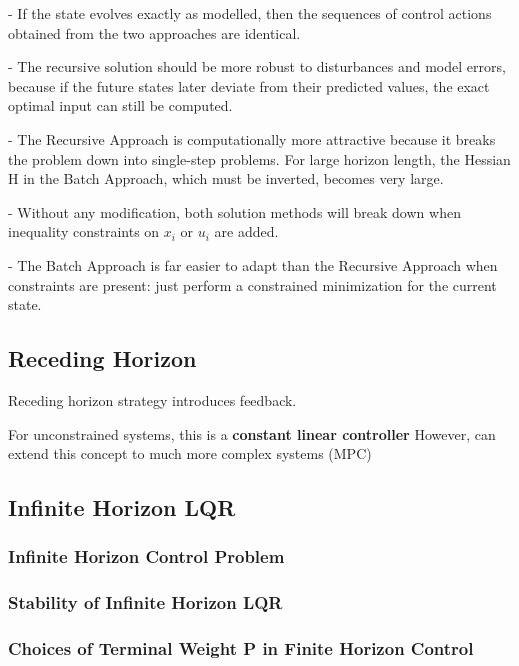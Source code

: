 - If the state evolves exactly as modelled,
then the sequences of control actions obtained from
the two approaches are identical.

- The recursive solution should be more robust to disturbances and model
errors, because if the future states later deviate from their predicted
values, the exact optimal input can still be computed.

- The Recursive Approach is computationally more attractive because it
breaks the problem down into single-step problems. For large horizon
length, the Hessian H in the Batch Approach, which must be inverted,
becomes very large.

- Without any modification, both solution methods will break down when
inequality constraints on $x_i$ or $u_i$ are added.

- The Batch Approach is far easier to adapt than the Recursive Approach
when constraints are present: just perform a constrained minimization for
the current state.

\subsection{Receding Horizon}

Receding horizon strategy introduces feedback.


For unconstrained systems, this is a \textbf{constant linear controller}
However, can extend this concept to much more complex systems (MPC)


\subsection{Infinite Horizon LQR}

\subsubsection{Infinite Horizon Control Problem}

\subsubsection{Stability of Infinite Horizon LQR}


\subsubsection{Choices of Terminal Weight P in Finite Horizon Control}

